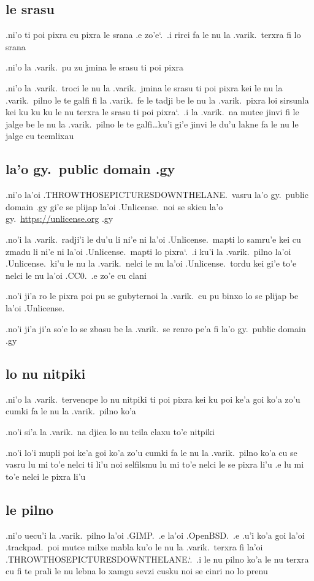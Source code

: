 \documentclass{report}
\newcommand\sds{\spacefactor\sfcode`.\ \space}
\begin{document}
\subsection{le srasu}
.ni'o ti poi pixra cu pixra le srana .e zo'e\sds  .i rirci fa le nu la .varik.\ terxra fi lo srana

.ni'o la .varik.\ pu zu jmina le srasu ti poi pixra

.ni'o la .varik.\ troci le nu la .varik.\ jmina le srasu ti poi pixra kei le nu la .varik.\ pilno le te galfi fi la .varik.\ fe le tadji be le nu la .varik.\ pixra loi sirsunla kei ku ku ku le nu terxra le srasu ti poi pixra\sds  .i la .varik.\ na mutce jinvi fi le jalge be le nu la .varik.\ pilno le te galfi\ldots ku'i gi'e jinvi le du'u lakne fa le nu le jalge cu tcemlixau

\subsection{la'o gy.\ public domain .gy}
.ni'o la'oi .THROWTHOSEPICTURESDOWNTHELANE.\ vasru la'o gy.\ public domain .gy gi'e se plijap la'oi .Unlicense.\ noi se skicu la'o gy.\ \url{https://unlicense.org} .gy

.no'i la .varik.\ radji'i le du'u li ni'e ni la'oi .Unlicense.\ mapti lo samru'e kei cu zmadu li ni'e ni la'oi .Unlicense.\ mapti lo pixra\sds  .i ku'i la .varik.\ pilno la'oi .Unlicense.\ ki'u le nu la .varik.\ nelci le nu la'oi .Unlicense.\ tordu kei gi'e to'e nelci le nu la'oi .CC0.\ .e zo'e cu clani

.no'i ji'a ro le pixra poi pu se gubyternoi la .varik.\ cu pu binxo lo se plijap be la'oi .Unlicense.

.no'i ji'a ji'a so'e lo se zbasu be la .varik.\ se renro pe'a fi la'o gy.\ public domain .gy

\subsection{lo nu nitpiki}
.ni'o la .varik.\ tervencpe lo nu nitpiki ti poi pixra kei ku poi ke'a goi ko'a zo'u cumki fa le nu la .varik.\ pilno ko'a

.no'i si'a la .varik.\ na djica lo nu tcila claxu to'e nitpiki

.no'i lo'i mupli poi ke'a goi ko'a zo'u cumki fa le nu la .varik.\ pilno ko'a cu se vasru lu mi to'e nelci ti li'u noi selfilsmu lu mi to'e nelci le se pixra li'u .e lu mi to'e nelci le pixra li'u

\subsection{le pilno}
.ni'o uecu'i la .varik.\ pilno la'oi .GIMP.\ .e la'oi .OpenBSD.\ .e .u'i ko'a goi la'oi .trackpad.\ poi mutce milxe mabla ku'o le nu la .varik.\ terxra fi la'oi .THROWTHOSEPICTURESDOWNTHELANE.\sds  .i le nu pilno ko'a le nu terxra cu fi te prali le nu lebna lo xamgu sevzi cusku noi se cinri no lo prenu
\end{document}
